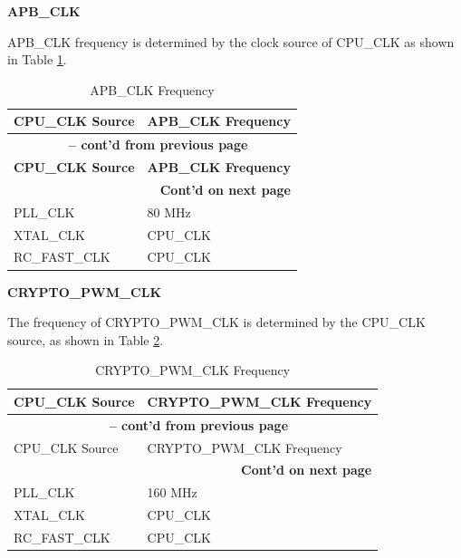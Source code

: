 \documentclass[main\_\_EN.tex]{subfiles}
\begin{document}
\textbf{APB\_CLK}

APB\_CLK frequency is determined by the clock source of CPU\_CLK as shown in Table \ref{tab:resclk-apb-clk-freq}.

 \begin{longtable}[c]{ |p{5cm}|p{5cm}| }
      \caption{APB\_CLK Frequency}
    \label{tab:resclk-apb-clk-freq} \\
        \hline
        \rowcolor{lightgray}
        \textbf{CPU\_CLK Source} & \textbf{APB\_CLK Frequency} \\
        \hline
        \endfirsthead

        \multicolumn{2}{c}{\bfseries \tablename\ \thetable{} -- cont'd from previous page}\\\hline

        \rowcolor{lightgray}
        \textbf{CPU\_CLK Source} & \textbf{APB\_CLK Frequency}\\
        \hline
        \endhead
        \multicolumn{2}{r}{\textbf{Cont'd on next page}} \\
        \endfoot
        \endlastfoot
        \hline
        PLL\_CLK & 80 MHz \\
        \hline
        XTAL\_CLK & CPU\_CLK \\
        \hline
        RC\_FAST\_CLK & CPU\_CLK \\
        \hline
\end{longtable}

\textbf{CRYPTO\_PWM\_CLK}

The frequency of CRYPTO\_PWM\_CLK is determined by the CPU\_CLK source, as shown in Table \ref{tab:resclk-crypto-clk-freq}.

 \begin{longtable}[c]{ |p{5cm}|p{5.5cm}| }
      \caption{CRYPTO\_PWM\_CLK Frequency}
    \label{tab:resclk-crypto-clk-freq} \\
        \hline
        \rowcolor{lightgray}
        \textbf{CPU\_CLK Source} & \textbf{CRYPTO\_PWM\_CLK Frequency} \\
        \hline
        \endfirsthead
        \multicolumn{2}{c}{\bfseries \tablename\ \thetable{} -- cont'd from previous page}\\\hline
        \rowcolor{lightgray}
        CPU\_CLK Source & CRYPTO\_PWM\_CLK Frequency \\
        \hline
        \endhead
        \multicolumn{2}{r}{\textbf{Cont'd on next page}} \\
        \endfoot
        \endlastfoot
        \hline
        PLL\_CLK & 160 MHz \\
        \hline
        XTAL\_CLK & CPU\_CLK \\
        \hline
        RC\_FAST\_CLK & CPU\_CLK \\
        \hline
\end{longtable}
\end{document}
